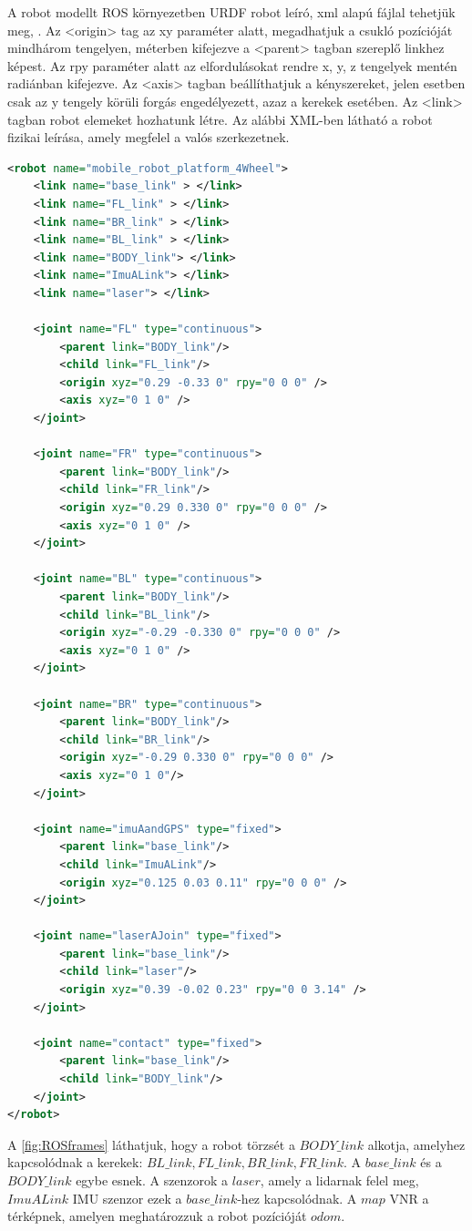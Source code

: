A robot modellt ROS környezetben URDF robot leíró, xml alapú fájlal tehetjük meg, \cite{rosURDF}
\cite{rosJoint} \cite{rosLink}.
Az <origin> tag az xy paraméter alatt, megadhatjuk a csukló pozícióját mindhárom tengelyen, méterben kifejezve a <parent> tagban szereplő linkhez képest. Az rpy paraméter alatt az elfordulásokat rendre x, y, z tengelyek mentén radiánban kifejezve.
Az <axis> tagban beállíthatjuk a kényszereket, jelen esetben csak az y tengely körüli forgás engedélyezett, azaz a kerekek esetében. 
Az <link> tagban robot elemeket hozhatunk létre. Az alábbi XML-ben látható a robot fizikai leírása, amely megfelel a valós szerkezetnek.
\begin{lstlisting}[language=XML]
<robot name="mobile_robot_platform_4Wheel">
	<link name="base_link" > </link>
	<link name="FL_link" > </link>
	<link name="BR_link" > </link>
	<link name="BL_link" > </link>
	<link name="BODY_link"> </link>  
	<link name="ImuALink"> </link>  
	<link name="laser"> </link> 

	<joint name="FL" type="continuous">
		<parent link="BODY_link"/>
		<child link="FL_link"/>    
		<origin xyz="0.29 -0.33 0" rpy="0 0 0" />
		<axis xyz="0 1 0" />
	</joint>

	<joint name="FR" type="continuous">
		<parent link="BODY_link"/>
		<child link="FR_link"/>    
		<origin xyz="0.29 0.330 0" rpy="0 0 0" />
		<axis xyz="0 1 0" />
	</joint>

	<joint name="BL" type="continuous">
		<parent link="BODY_link"/>
		<child link="BL_link"/>
		<origin xyz="-0.29 -0.330 0" rpy="0 0 0" />
		<axis xyz="0 1 0" />
	</joint>

	<joint name="BR" type="continuous">
		<parent link="BODY_link"/>
		<child link="BR_link"/>     
		<origin xyz="-0.29 0.330 0" rpy="0 0 0" />
		<axis xyz="0 1 0"/>
	</joint>

	<joint name="imuAandGPS" type="fixed">
		<parent link="base_link"/>
		<child link="ImuALink"/>
		<origin xyz="0.125 0.03 0.11" rpy="0 0 0" />
	</joint>

	<joint name="laserAJoin" type="fixed">
		<parent link="base_link"/>
		<child link="laser"/>
		<origin xyz="0.39 -0.02 0.23" rpy="0 0 3.14" />
	</joint>  

	<joint name="contact" type="fixed">
		<parent link="base_link"/>
		<child link="BODY_link"/>
	</joint> 
</robot>
\end{lstlisting}

A \ref{fig:ROSframes} láthatjuk, hogy a robot törzsét a $BODY\_link$ alkotja, amelyhez kapcsolódnak a kerekek: $BL\_link,FL\_link,BR\_link,FR\_link$. A $base\_link$ és a $BODY\_link$ egybe esnek. A szenzorok a $laser$, amely a lidarnak felel meg, $ImuALink$ IMU szenzor ezek a $base\_link$-hez kapcsolódnak.
A $map$ VNR a térképnek, amelyen meghatározzuk a robot pozícióját $odom$.

\renewcommand{\img}{SajatRobot/ROS/frames.svg}
\renewcommand{\sources}{*}
\renewcommand{\svg}{svg}
\renewcommand{\aspectratioPic}{1.5}
\renewcommand{\rotationAnglePic}{90}
\renewcommand{\captionn}{A megvalósított robot VNR-k közti reláció }
\renewcommand{\figlabel}{ROSframes}




